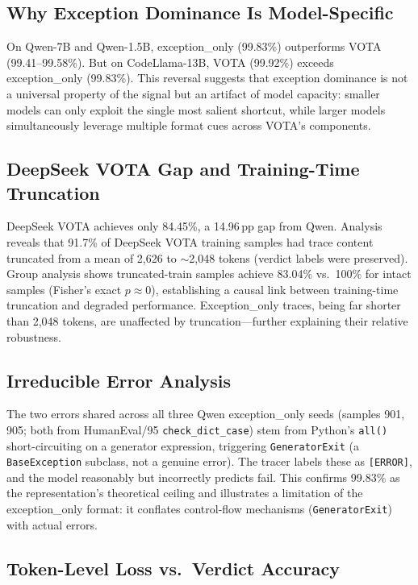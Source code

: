 \documentclass[11pt,a4paper]{article}
\newcommand{\pp}{\,\text{pp}}
\begin{document}
\subsection{Why Exception Dominance Is Model-Specific}

On Qwen-7B and Qwen-1.5B, exception\_only (99.83\%) outperforms VOTA (99.41--99.58\%).
But on CodeLlama-13B, VOTA (99.92\%) exceeds exception\_only (99.83\%).
This reversal suggests that exception dominance is not a universal property of the signal but an artifact of model capacity: smaller models can only exploit the single most salient shortcut, while larger models simultaneously leverage multiple format cues across VOTA's components.

\subsection{DeepSeek VOTA Gap and Training-Time Truncation}

DeepSeek VOTA achieves only 84.45\%, a 14.96$\pp$ gap from Qwen.
Analysis reveals that 91.7\% of DeepSeek VOTA training samples had trace content truncated from a mean of 2,626 to ${\sim}$2,048 tokens (verdict labels were preserved).
Group analysis shows truncated-train samples achieve 83.04\% vs.\ 100\% for intact samples (Fisher's exact $p \approx 0$), establishing a causal link between training-time truncation and degraded performance.
Exception\_only traces, being far shorter than 2,048 tokens, are unaffected by truncation---further explaining their relative robustness.

\subsection{Irreducible Error Analysis}

The two errors shared across all three Qwen exception\_only seeds (samples 901, 905; both from HumanEval/95 \texttt{check\_dict\_case}) stem from Python's \texttt{all()} short-circuiting on a generator expression, triggering \texttt{GeneratorExit} (a \texttt{BaseException} subclass, not a genuine error).
The tracer labels these as \texttt{[ERROR]}, and the model reasonably but incorrectly predicts fail.
This confirms 99.83\% as the representation's theoretical ceiling and illustrates a limitation of the exception\_only format: it conflates control-flow mechanisms (\texttt{GeneratorExit}) with actual errors.

\subsection{Token-Level Loss vs.\ Verdict Accuracy}
\end{document}
